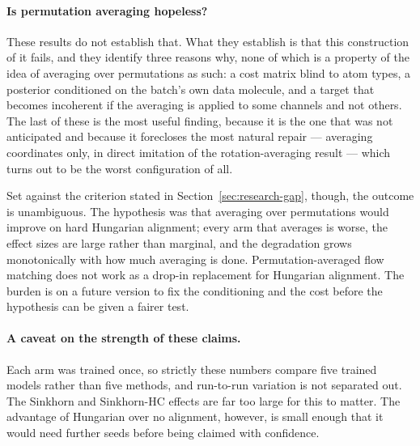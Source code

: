 \paragraph{Is permutation averaging hopeless?}
These results do not establish that. What they establish is that this construction of it fails, and
they identify three reasons why, none of which is a property of the idea of averaging over
permutations as such: a cost matrix blind to atom types, a posterior conditioned on the batch's own
data molecule, and a target that becomes incoherent if the averaging is applied to some channels and
not others. The last of these is the most useful finding, because it is the one that was not
anticipated and because it forecloses the most natural repair --- averaging coordinates only, in
direct imitation of the rotation-averaging result --- which turns out to be the worst configuration
of all.

Set against the criterion stated in Section~\ref{sec:research-gap}, though, the outcome is
unambiguous. The hypothesis was that averaging over permutations would improve on hard Hungarian
alignment; every arm that averages is worse, the effect sizes are large rather than marginal, and
the degradation grows monotonically with how much averaging is done. Permutation-averaged flow
matching does not work as a drop-in replacement for Hungarian alignment. The burden is on a future
version to fix the conditioning and the cost before the hypothesis can be given a fairer test.

\paragraph{A caveat on the strength of these claims.}
Each arm was trained once, so strictly these numbers compare five trained models rather than five
methods, and run-to-run variation is not separated out. The Sinkhorn and Sinkhorn-HC effects are
far too large for this to matter. The advantage of Hungarian over no alignment, however, is small
enough that it would need further seeds before being claimed with confidence.
